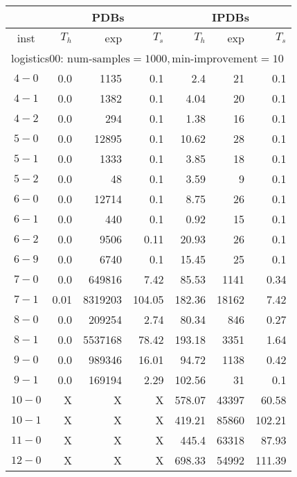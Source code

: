 \begin{longtable}{|c||r|r|r||r|r|r|}\firsthline
& \multicolumn{3}{c||}{PDBs} & \multicolumn{3}{c||}{IPDBs}\\\hline
inst & $T_h$ & exp & $T_s$ & $T_h$ & exp & $T_s$\\\hline
\multicolumn{7}{|l|}{logistics00: $\text{num-samples}=1000,\text{min-improvement}=10$}\\\hline
$4-0$ & 0.0 & 1135 & 0.1 &2.4 & 21 & 0.1 \\\hline
$4-1$ & 0.0 & 1382 & 0.1 &4.04 & 20 & 0.1 \\\hline
$4-2$ & 0.0 & 294 & 0.1 &1.38 & 16 & 0.1 \\\hline
$5-0$ & 0.0 & 12895 & 0.1 &10.62 & 28 & 0.1 \\\hline
$5-1$ & 0.0 & 1333 & 0.1 &3.85 & 18 & 0.1 \\\hline
$5-2$ & 0.0 & 48 & 0.1 &3.59 & 9 & 0.1 \\\hline
$6-0$ & 0.0 & 12714 & 0.1 &8.75 & 26 & 0.1 \\\hline
$6-1$ & 0.0 & 440 & 0.1 &0.92 & 15 & 0.1 \\\hline
$6-2$ & 0.0 & 9506 & 0.11 &20.93 & 26 & 0.1 \\\hline
$6-9$ & 0.0 & 6740 & 0.1 &15.45 & 25 & 0.1 \\\hline
$7-0$ & 0.0 & 649816 & 7.42 &85.53 & 1141 & 0.34 \\\hline
$7-1$ & 0.01 & 8319203 & 104.05 &182.36 & 18162 & 7.42 \\\hline
$8-0$ & 0.0 & 209254 & 2.74 &80.34 & 846 & 0.27 \\\hline
$8-1$ & 0.0 & 5537168 & 78.42 &193.18 & 3351 & 1.64 \\\hline
$9-0$ & 0.0 & 989346 & 16.01 &94.72 & 1138 & 0.42 \\\hline
$9-1$ & 0.0 & 169194 & 2.29 &102.56 & 31 & 0.1 \\\hline
$10-0$ & X & X & X &578.07 & 43397 & 60.58 \\\hline
$10-1$ & X & X & X &419.21 & 85860 & 102.21 \\\hline
$11-0$ & X & X & X &445.4 & 63318 & 87.93 \\\hline
$12-0$ & X & X & X &698.33 & 54992 & 111.39 \\\hline


\end{longtable}
